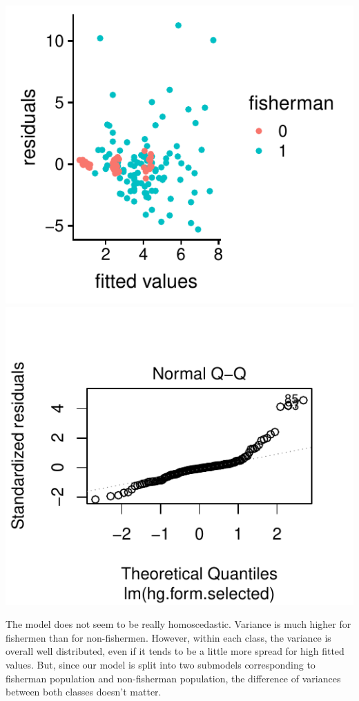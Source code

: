 \documentclass[12pt,]{article}
\begin{document}
\includegraphics{Report_files/figure-latex/unnamed-chunk-18-1.pdf}
\includegraphics{Report_files/figure-latex/unnamed-chunk-18-2.pdf}

The model does not seem to be really homoscedastic. Variance is much
higher for fishermen than for non-fishermen. However, within each class,
the variance is overall well distributed, even if it tends to be a
little more spread for high fitted values. But, since our model is split
into two submodels corresponding to fisherman population and
non-fisherman population, the difference of variances between both
classes doesn't matter.
\end{document}
